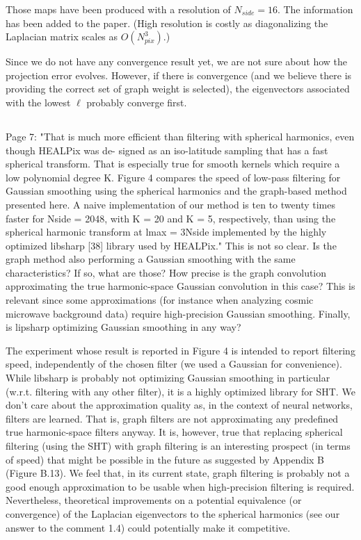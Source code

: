 \documentclass[12pt,a4paper]{article}
\newcommand{\1}{\b{1}}              %
\newcommand{\0}{\b{0}}              %
\begin{document}
Those maps have been produced with a resolution of $N_{side}=16$. The information has been added to the paper. (High resolution is costly as diagonalizing the Laplacian matrix scales as $O(N_{pix}^3)$.)

Since we do not have any convergence result yet, we are not sure about how the projection error evolves. However, if there is convergence (and we believe there is providing the correct set of graph weight is selected), the eigenvectors associated with the lowest $\ell$ probably converge first.

\subsection{}
\begin{mdframed}[style=comment]
Page 7: "That is much more efficient than filtering with spherical harmonics, even though HEALPix was de- signed as an iso-latitude sampling that has a fast spherical transform. That is especially true for smooth kernels which require a low polynomial degree K. Figure 4 compares the speed of low-pass filtering for Gaussian smoothing using the spherical harmonics and the graph-based method presented here. A naive implementation of our method is ten to twenty times faster for Nside = 2048, with K = 20 and K = 5, respectively, than using the spherical harmonic transform at lmax = 3Nside implemented by the highly optimized libsharp [38] library used by HEALPix." This is not so clear. Is the graph method also performing a Gaussian smoothing with the same characteristics? If so, what are those? How precise is the graph convolution approximating the true harmonic-space Gaussian convolution in this case? This is relevant since some approximations (for instance when analyzing cosmic microwave background data) require high-precision Gaussian smoothing. Finally, is lipsharp optimizing Gaussian smoothing in any way?
\end{mdframed}

The experiment whose result is reported in Figure 4 is intended to report filtering speed, independently of the chosen filter (we used a Gaussian for convenience).
While libsharp is probably not optimizing Gaussian smoothing in particular (w.r.t. filtering with any other filter), it is a highly optimized library for SHT.
We don't care about the approximation quality as, in the context of neural networks, filters are learned.
That is, graph filters are not approximating any predefined true harmonic-space filters anyway.
It is, however, true that replacing spherical filtering (using the SHT) with graph filtering is an interesting prospect (in terms of speed) that might be possible in the future as suggested by Appendix B (Figure B.13).
We feel that, in its current state, graph filtering is probably not a good enough approximation to be usable when high-precision filtering is required.
Nevertheless, theoretical improvements on a potential equivalence (or convergence) of the Laplacian eigenvectors to the spherical harmonics (see our answer to the comment 1.4) could potentially make it competitive.
\end{document}
